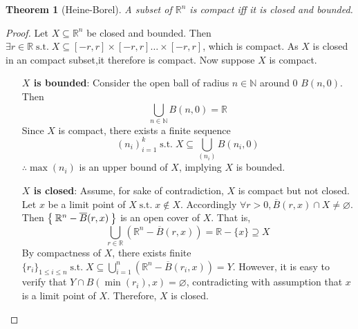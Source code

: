\documentclass[12pt]{amsart}
\newcommand{\bbR}{\mathbb{R}}
\newcommand{\bbN}{\mathbb{N}}
\newcommand{\suchthat}{\operatorname{s.t.}}
\theoremstyle{plain}
\newtheorem*{thm}{Theorem}
\theoremstyle{remark}
\theoremstyle{definition}
\begin{document}
\begin{thm}[Heine-Borel]
A subset of $\bbR^n$ is compact iff it is closed and bounded.
\end{thm}
\begin{proof}
Let $X \subseteq \bbR^n$ be closed and bounded. Then $\exists r \in \bbR \suchthat X\subseteq [-r,r] \times [-r,r] \dots \times [-r,r]$, which is compact. 
\newline
As $X$ is closed in an compact subset,it therefore is compact.
\newline
Now suppose $X$ is compact.
\begin{itemize}
\item[{\bfseries $X$ is bounded}:] 
Consider the open ball of radius $n \in \bbN$ around $0$ $B(n,0)$. Then
\begin{equation*}
\bigcup\limits_{n\in\bbN}B(n,0) = \bbR
\end{equation*}
Since $X$ is compact, there exists a finite sequence
\begin{equation*}
(n_i)_{i=1}^k \suchthat X \subseteq \bigcup\limits_{(n_i)}B(n_i, 0)
\end{equation*}
$\therefore \max({n_i})$ is an upper bound of $X$, implying $X$ is bounded.
\item[{\bfseries $X$ is closed}:] 
Assume, for sake of contradiction, $X$ is compact but not closed.
\newline
Let $x$ be a limit point of $X \suchthat x \notin X$. Accordingly $\forall r > 0, \overline{B}(r, x) \cap X \neq \varnothing$. Then
$\Set{\bbR^n - \overline{B}(r,x)}$ is an open cover of $X$. That is,
\begin{equation*}
\bigcup\limits_{r\in \bbR}\left( \bbR^n - \overline{B}(r, x) \right) = \bbR - \{x\} \supseteq X
\end{equation*}
By compactness of $X$, there exists finite $\{r_i\}_{1\leqslant i\leqslant n} \suchthat X \subseteq \bigcup\limits_{i=1}^n\left( \bbR^n-\overline{B}(r_i,x) \right) = Y$.
\newline
However, it is easy to verify that $Y \cap B(\min(r_i), x) = \varnothing$, contradicting with assumption that $x$ is a limit point of $X$.
\newline
Therefore, $X$ is closed.
\end{itemize}
\end{proof}
\end{document}
